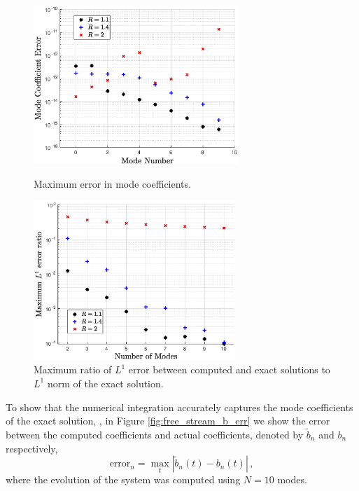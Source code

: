 \begin{figure}[ht]
\begin{minipage}[t]{0.5\linewidth}
\centerline{\includegraphics[height=6cm]{06-appendix/SpectralMethodBoltzmann/Figures/free_stream_b_err.eps}}
\caption{Maximum error in mode coefficients.}\label{fig:free_stream_b_err}
 \end{minipage}
 \hspace{0.5cm}
 \begin{minipage}[t]{0.5\linewidth}
\centerline{\includegraphics[height=6.0cm]{06-appendix/SpectralMethodBoltzmann/Figures/free_stream_L1_err.eps}}
\caption{Maximum ratio  of $L^1$ error between computed and exact solutions to $L^1$ norm of the exact solution.}\label{fig:free_stream_L1_err}
\end{minipage}
\end{figure}

To show that the numerical integration accurately captures the mode coefficients of the exact solution, , in Figure \ref{fig:free_stream_b_err} we show the error between the computed coefficients and actual coefficients, denoted by $\tilde b_n$ and $b_n$ respectively,
\begin{equation}\label{mode_err_def}
\text{error}_n=\max_{t} |\tilde{b}_n(t)-b_n(t)|\,,
\end{equation}
 where the evolution of the system was computed using $N=10$ modes.




